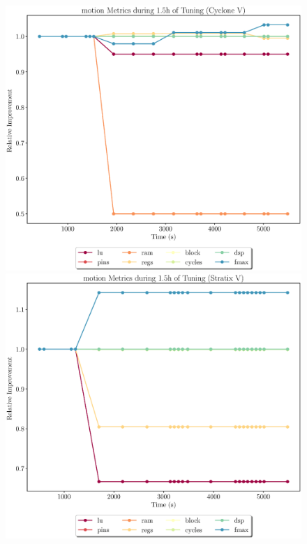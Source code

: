 \documentclass[12pt, a4paper]{article}
\begin{document}
\begin{figure}[htpb]
    \begin{minipage}{.48\textwidth}
        \includegraphics[scale=.29]{motion_all_5400_chstone_CycloneV}
    \end{minipage}%
    \hfill
    \begin{minipage}{.48\textwidth}
        \includegraphics[scale=.29]{motion_all_5400_chstone_StratixV}
    \end{minipage}%
\end{figure}
\end{document}
